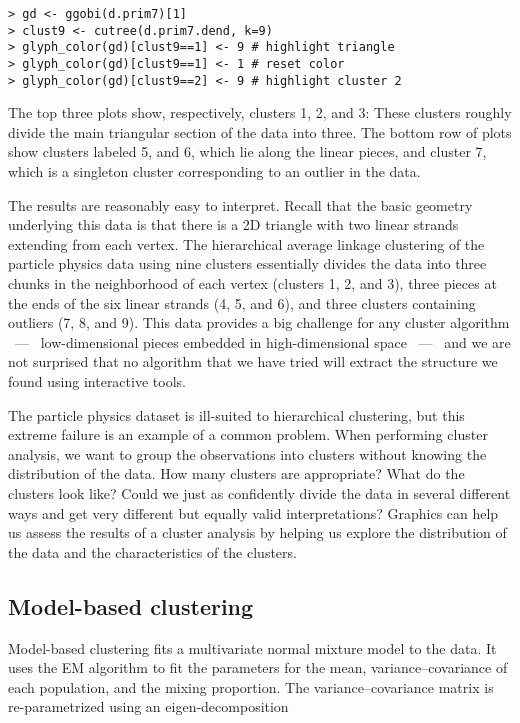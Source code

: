 \begin{verbatim}
> gd <- ggobi(d.prim7)[1]
> clust9 <- cutree(d.prim7.dend, k=9)
> glyph_color(gd)[clust9==1] <- 9 # highlight triangle
> glyph_color(gd)[clust9==1] <- 1 # reset color
> glyph_color(gd)[clust9==2] <- 9 # highlight cluster 2
\end{verbatim}

The top three plots show, respectively, clusters 1, 2, and 3: These
clusters roughly divide the main triangular section of the data into
three. The bottom row of plots show clusters labeled 5, and 6, which
lie along the linear pieces, and cluster 7, which is a singleton
cluster corresponding to an outlier in the data.

The results are reasonably easy to interpret. Recall that the basic
geometry underlying this data is that there is a 2D triangle with two
linear strands extending from each vertex.  The hierarchical average
linkage clustering of the particle physics data using nine clusters
essentially divides the data into three chunks in the neighborhood of
each vertex (clusters 1, 2, and 3), three pieces at the ends of the
six linear strands (4, 5, and 6), and three clusters containing
outliers (7, 8, and 9).  This data provides a big challenge for any cluster
algorithm ~---~ low-dimensional pieces embedded in high-dimensional space
~---~ and we are not surprised that no algorithm that we have tried will
extract the structure we found using interactive tools.

The particle physics dataset is ill-suited to hierarchical clustering,
but this extreme failure is an example of a common problem.  When
performing cluster analysis, we want to group the observations into
clusters without knowing the distribution of the data.  How many
clusters are appropriate? What do the clusters look like?  Could we
just as confidently divide the data in several different ways and get
very different but equally valid interpretations? Graphics can help us
assess the results of a cluster analysis by helping us explore the
distribution of the data and the characteristics of the clusters.


\subsection{Model-based clustering}

Model-based clustering \cite{FR02} fits a multivariate normal mixture
model to the data. It uses the EM algorithm to fit the parameters for
the mean, variance--covariance of each population, and the mixing
proportion. The variance--covariance matrix is re-parametrized using an
eigen-decomposition

